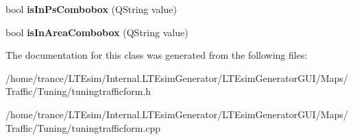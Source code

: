 \begin{DoxyCompactItemize}
\item 
bool {\bfseries is\+In\+Ps\+Combobox} (Q\+String value)\hypertarget{class_tuning_traffic_form_a3d9594f36cb41a730655e7edc8593001}{}\label{class_tuning_traffic_form_a3d9594f36cb41a730655e7edc8593001}

\item 
bool {\bfseries is\+In\+Area\+Combobox} (Q\+String value)\hypertarget{class_tuning_traffic_form_aca99611542b82ad42a77a9f1c9fe3b21}{}\label{class_tuning_traffic_form_aca99611542b82ad42a77a9f1c9fe3b21}

\end{DoxyCompactItemize}


The documentation for this class was generated from the following files\+:\begin{DoxyCompactItemize}
\item 
/home/trance/\+L\+T\+Esim/\+Internal.\+L\+T\+Esim\+Generator/\+L\+T\+Esim\+Generator\+G\+U\+I/\+Maps/\+Traffic/\+Tuning/tuningtrafficform.\+h\item 
/home/trance/\+L\+T\+Esim/\+Internal.\+L\+T\+Esim\+Generator/\+L\+T\+Esim\+Generator\+G\+U\+I/\+Maps/\+Traffic/\+Tuning/tuningtrafficform.\+cpp\end{DoxyCompactItemize}
